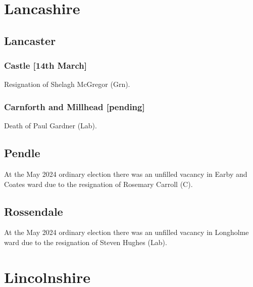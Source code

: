 \documentclass[a4paper,openany]{book}
\begin{document}
\begin{resultsiii}
\section{Lancashire}

\subsection*{Lancaster}

\subsubsection*{Castle \hspace*{\fill}\nolinebreak[1]%
	\enspace\hspace*{\fill}
	[14th March]}


Resignation of Shelagh McGregor (Grn).

\subsubsection*{Carnforth and Millhead \hspace*{\fill}\nolinebreak[1]%
	\enspace\hspace*{\fill}
	[pending]}


Death of Paul Gardner (Lab).

\subsection*{Pendle}

At the May 2024 ordinary election there was an unfilled vacancy in Earby and Coates ward due to the resignation of Rosemary Carroll (C).%

\subsection*{Rossendale}

At the May 2024 ordinary election there was an unfilled vacancy in Longholme ward due to the resignation of Steven Hughes (Lab).%

\section{Lincolnshire}


\end{resultsiii}
\end{document}
